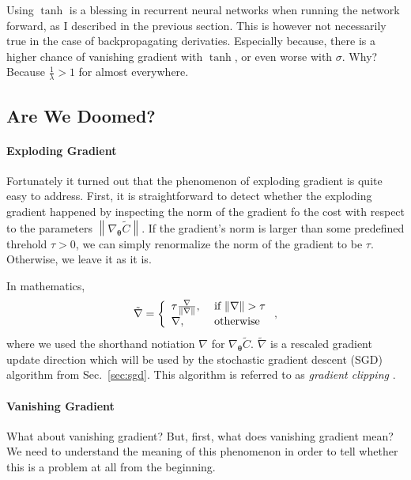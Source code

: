 \documentclass{report}
\newcommand{\vects}[1]{\boldsymbol{#1}}
\newcommand{\TT}[0]{\vects{\theta}}
\newcommand{\sigmoid}{\sigma}
\begin{document}
Using $\tanh$ is a blessing in recurrent neural networks when running the
network forward, as I described in the previous section. This is however not
necessarily true in the case of backpropagating derivaties. Especially because, 
there is a higher chance of vanishing gradient with $\tanh$, or even worse with
$\sigmoid$. Why? Because $\frac{1}{\lambda} > 1$ for almost everywhere.

\subsection{Are We Doomed?}
\label{sec:rnn_vanish_grad}

\paragraph{Exploding Gradient}

Fortunately it turned out that the phenomenon of exploding gradient is quite
easy to address. First, it is straightforward to detect whether the exploding
gradient happened by inspecting the norm of the gradient fo the cost with
respect to the parameters $\left\| \nabla_{\TT} \tilde{C} \right\|$. If the
gradient's norm is larger than some predefined threhold $\tau > 0$, we can
simply renormalize the norm of the gradient to be $\tau$. Otherwise, we leave it
as it is.

In mathematics,
\begin{align*}
    \tilde{\nabla} = 
    \left\{
        \begin{array}{l l}
            \tau \frac{\nabla}{\|\nabla\|}, & \text{ if } \|\nabla\| > \tau \\
            \nabla, & \text{ otherwise}
        \end{array}
    \right.,
\end{align*}
where we used the shorthand notiation $\nabla$ for $\nabla_{\TT} \tilde{C}$.
$\tilde{\nabla}$ is a rescaled gradient update direction which will be used by
the stochastic gradient descent (SGD) algorithm from Sec.~\ref{sec:sgd}. This
algorithm is referred to as {\em gradient clipping}
\citep{pascanu2013difficulty}.

\paragraph{Vanishing Gradient}

What about vanishing gradient? But, first, what does vanishing gradient mean? We
need to understand the meaning of this phenomenon in order to tell whether this
is a problem at all from the beginning.
\end{document}
